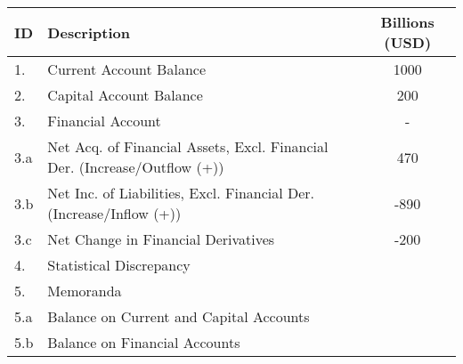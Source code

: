 \begin{table}[ht]
    \centering
    \begin{tabular}{l|lc}
    \toprule
     \textbf{ID} & \textbf{Description} & \textbf{Billions (USD)} \\
     \midrule
     1. & Current Account Balance & 1000 \\
     2. & Capital Account Balance & 200 \\
     3. & Financial Account & - \\
     3.a & Net Acq. of Financial Assets, Excl. Financial Der. (Increase/Outflow (+)) & 470 \\
     3.b & Net Inc. of Liabilities, Excl. Financial Der. (Increase/Inflow (+)) & -890 \\
     3.c & Net Change in Financial Derivatives & -200 \\
     4. & Statistical Discrepancy & \\
     5. & Memoranda & \\
     5.a & Balance on Current and Capital Accounts & \\
     5.b & Balance on Financial Accounts & \\
    \bottomrule 
    \end{tabular}
    \label{tab:my_label}
\end{table}